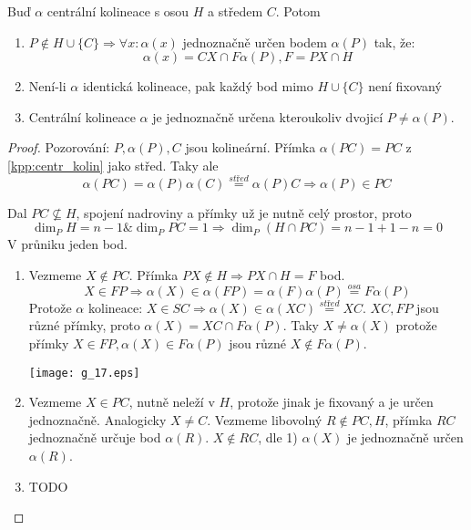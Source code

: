 \begin{lemma}\label{kpp:centr_kolin_prop}
    Buď $\alpha$ centrální kolineace s osou $H$ a středem $C$. Potom
    \begin{enumerate}
        \item $P\not\in H\cup\{C\}\Rightarrow \forall x: \alpha(x)$ jednoznačně určen bodem $\alpha(P)$ tak, že:
		\[ \alpha(x)=CX\cap F\alpha(P), F=PX\cap H \]
        \item Není-li $\alpha$ identická kolineace, pak každý bod mimo $H\cup \{C\}$ není fixovaný
        \item Centrální kolineace $\alpha$ je jednoznačně určena kteroukoliv dvojicí $P\neq\alpha(P)$.
    \end{enumerate}
\end{lemma}
\begin{proof}
	Pozorování: $P, \alpha(P), C$ jsou kolineární.
	Přímka $\alpha(PC) = PC$ z \cref{kpp:centr_kolin} jako střed.
	Taky ale
	\[ \alpha(PC) = \alpha(P)\alpha(C) \stackrel{střed}{=} \alpha(P) C \Rightarrow \alpha(P) \in PC \]

	Dal $PC \nsubseteq H$, spojení nadroviny a přímky už je nutně celý prostor, proto
	\[ \dim_P H = n - 1 \& \dim_P PC = 1 \Rightarrow \dim_P (H \cap PC) = n - 1 + 1 - n = 0 \]
	V průniku jeden bod.

    \begin{enumerate}
	    \item Vezmeme $X \notin PC$.
		    Přímka $PX \notin H \Rightarrow PX \cap H = F$ bod.
		    \[ X \in FP \Rightarrow \alpha(X) \in \alpha(FP) = \alpha(F)\alpha(P) \stackrel{osa}{=} F\alpha(P) \]
		    Protože $\alpha$ kolineace: $X \in SC \Rightarrow \alpha(X) \in \alpha(XC) \stackrel{střed}{=} XC$.
		    $XC, FP$ jsou různé přímky, proto $\alpha(X) = XC \cap F\alpha(P)$.
		    Taky $X \ne \alpha(X)$ protože přímky $X \in FP, \alpha(X) \in F\alpha(P)$ jsou různé $X \notin F\alpha(P)$.

    	\texttt{[image: g\_17.eps]}
\item Vezmeme $X \in PC$, nutně neleží v $H$, protože jinak je fixovaný a je určen jednoznačně.
	Analogicky $X \ne C$.
	Vezmeme libovolný $R \notin PC, H$, přímka $RC$ jednoznačně určuje bod $\alpha(R)$.
	$X \notin RC$, dle 1) $\alpha(X)$ je jednoznačně určen $\alpha(R)$.

	\item TODO
    \end{enumerate}
\end{proof}

